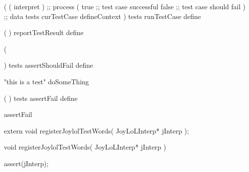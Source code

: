 \startJoylolCode
(
  ( interpret ) ;; process
  (
    true ;; test case successful
    false ;; test case should fail
  ) ;; data
  tests
  curTestCase
  defineContext
)
tests
runTestCase
define
\stopJoylolCode

\stopTestSuite

\startTestSuite[reportTestResult]

\startJoylolCode
  (
  )
  reportTestResult
  define
\stopJoylolCode

\stopTestSuite

\startTestSuite[assertShouldFail]

\startJoylolCode

(
  
)
tests
assertShouldFail
define
\stopJoylolCode

\startJoylolTest
"this is a test"
doSomeThing
\stopJoylolTest
\stopTestCase
\stopTestSuite

\startTestSuite[assertFail]

\startJoylolCode
(
)
tests
assertFail
define
\stopJoylolCode

\startJoylolTest
assertFail
\stopJoylolTest
\stopTestCase
\stopTestSuite

\startTestSuite[assertSucceed]

\stopTestSuite

\startTestSuite[assertTrue]

\stopTestSuite

\startTestSuite[assertFalse]

\stopTestSuite

\startTestSuite[assertNil]

\stopTestSuite

\startTestSuite[assertNotNil]

\stopTestSuite

\startTestSuite[assertAtom]

\stopTestSuite

\startTestSuite[assertPair]

\stopTestSuite

\startTestSuite[assertNatural]

\stopTestSuite

\startTestSuite[assertSymbol]

\stopTestSuite

\startTestSuite[assertContext]

\stopTestSuite

\startTestSuite[assertDictionary]

\stopTestSuite

\startTestSuite[assertDictNode]

\stopTestSuite


\startCHeader
extern void registerJoylolTestWords(
  JoyLoLInterp* jInterp
);
\stopCHeader
{}

\startCCode
void registerJoylolTestWords(
  JoyLoLInterp* jInterp
) {
  assert(jInterp);

}
\stopCCode